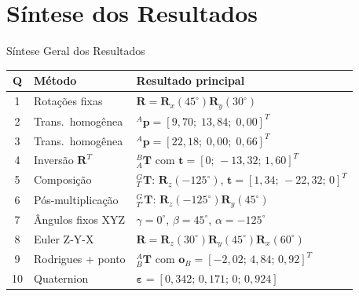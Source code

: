\documentclass[aspectratio=169,12pt]{beamer}
\newcommand{\Rx}[1]{\mathbf{R}_x(#1)}
\newcommand{\Ry}[1]{\mathbf{R}_y(#1)}
\newcommand{\Rz}[1]{\mathbf{R}_z(#1)}
\newcommand{\degr}{^{\circ}}
\begin{document}
\section{Síntese dos Resultados}

\begin{frame}{Síntese Geral dos Resultados}
  \begin{center}
  \small
  \begin{tabular}{clp{6.2cm}}
    \toprule
    \textbf{Q} & \textbf{Método} & \textbf{Resultado principal}\\
    \midrule
    1 & Rotações fixas & $\mathbf{R}=\Rx{45\degr}\Ry{30\degr}$\\
    2 & Trans.\ homogênea & ${}^{A}\mathbf{p}=[9{,}70;\;13{,}84;\;0{,}00]^T$\\
    3 & Trans.\ homogênea & ${}^{A}\mathbf{p}=[22{,}18;\;0{,}00;\;0{,}66]^T$\\
    4 & Inversão $\mathbf{R}^T$ & ${}^{B}_{A}\mathbf{T}$ com $\mathbf{t}=[0;\,-13{,}32;\,1{,}60]^T$\\
    5 & Composição & ${}^{G}_{T}\mathbf{T}$: $\Rz{-125\degr}$, $\mathbf{t}=[1{,}34;\,-22{,}32;\,0]^T$\\
    6 & Pós-multiplicação & ${}^{G}_{T'}\mathbf{T}$: $\Rz{-125\degr}\Ry{45\degr}$\\
    7 & Ângulos fixos XYZ & $\gamma=0\degr$, $\beta=45\degr$, $\alpha=-125\degr$\\
    8 & Euler Z-Y-X & $\mathbf{R}=\Rz{30\degr}\Ry{45\degr}\Rx{60\degr}$\\
    9 & Rodrigues + ponto & ${}^{A}_{B}\mathbf{T}$ com $\mathbf{o}_B=[-2{,}02;\,4{,}84;\,0{,}92]^T$\\
    10 & Quaternion & $\boldsymbol{\varepsilon}=[0{,}342;\,0{,}171;\,0;\,0{,}924]$\\
    \bottomrule
  \end{tabular}
  \end{center}
\end{frame}
\end{document}
